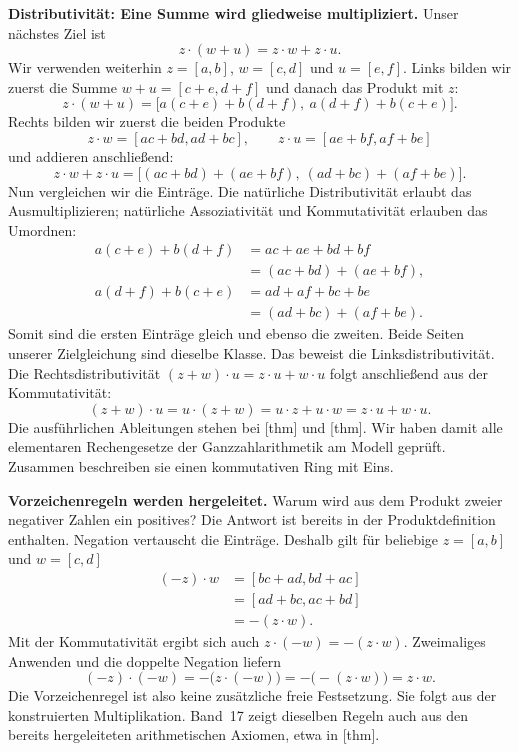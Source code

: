 \medskip\noindent\textbf{Distributivität: Eine Summe wird gliedweise multipliziert.}
Unser nächstes Ziel ist
\[
  z\cdot(w+u)=z\cdot w+z\cdot u.
\]
Wir verwenden weiterhin \(z=[a,b]\), \(w=[c,d]\) und
\(u=[e,f]\). Links bilden wir zuerst die Summe
\(w+u=[c+e,d+f]\) und danach das Produkt mit \(z\):
\[
  z\cdot(w+u)
    =\bigl[a(c+e)+b(d+f),\ a(d+f)+b(c+e)\bigr].
\]
Rechts bilden wir zuerst die beiden Produkte
\[
  z\cdot w=[ac+bd,ad+bc],\qquad
  z\cdot u=[ae+bf,af+be]
\]
und addieren anschließend:
\[
  z\cdot w+z\cdot u
    =\bigl[(ac+bd)+(ae+bf),\ (ad+bc)+(af+be)\bigr].
\]
Nun vergleichen wir die Einträge. Die natürliche Distributivität
erlaubt das Ausmultiplizieren; natürliche Assoziativität und
Kommutativität erlauben das Umordnen:
\[
  \begin{aligned}
    a(c+e)+b(d+f)
      &=ac+ae+bd+bf\\
      &=(ac+bd)+(ae+bf),\\[.3em]
    a(d+f)+b(c+e)
      &=ad+af+bc+be\\
      &=(ad+bc)+(af+be).
  \end{aligned}
\]
Somit sind die ersten Einträge gleich und ebenso die zweiten.
Beide Seiten unserer Zielgleichung sind dieselbe Klasse. Das
beweist die Linksdistributivität. Die Rechtsdistributivität
\((z+w)\cdot u=z\cdot u+w\cdot u\) folgt anschließend aus der
Kommutativität:
\[
  (z+w)\cdot u
    =u\cdot(z+w)
    =u\cdot z+u\cdot w
    =z\cdot u+w\cdot u.
\]
Die ausführlichen Ableitungen stehen bei
[thm] und
[thm]. Wir haben damit alle
elementaren Rechengesetze der Ganzzahlarithmetik am Modell geprüft.
Zusammen beschreiben sie einen kommutativen Ring mit Eins.

\medskip\noindent\textbf{Vorzeichenregeln werden hergeleitet.}
Warum wird aus dem Produkt zweier negativer Zahlen ein positives?
Die Antwort ist bereits in der Produktdefinition enthalten. Negation
vertauscht die Einträge. Deshalb gilt für beliebige \(z=[a,b]\)
und \(w=[c,d]\)
\[
  \begin{aligned}
    (-z)\cdot w
      &=[bc+ad,bd+ac]\\
      &=[ad+bc,ac+bd]\\
      &=-(z\cdot w).
  \end{aligned}
\]
Mit der Kommutativität ergibt sich auch
\(z\cdot(-w)=-(z\cdot w)\). Zweimaliges Anwenden und die
doppelte Negation liefern
\[
  (-z)\cdot(-w)
    =-\bigl(z\cdot(-w)\bigr)
    =-\bigl(-(z\cdot w)\bigr)
    =z\cdot w.
\]
Die Vorzeichenregel ist also keine zusätzliche freie Festsetzung.
Sie folgt aus der konstruierten Multiplikation. Band~17 zeigt dieselben
Regeln auch aus den bereits hergeleiteten arithmetischen Axiomen, etwa
in [thm].

